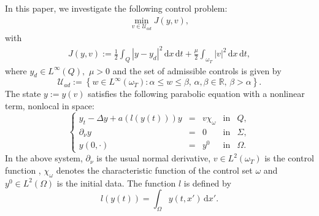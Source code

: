 \documentclass[reqno,twoside]{amsart}
\numberwithin{equation}{section}
\theoremstyle{definition}
\newcommand\abs[1]{\left\lvert#1\right\rvert}
\numberwithin{equation}{section}
\def \dis {\displaystyle}
\def \R {\mathbb{R}}
\def \dxp{\mathrm{d}x'}
\def \dq {\mathrm{d}x \, \mathrm{d}t}
\def \R {\mathbb{R}}
\begin{document}
In this paper, we investigate the following control problem:
\begin{align}\label{opt}
	\dis \min_{v\in {\mathcal{U}_{ad}}}J(y,v),
\end{align}
with
\begin{align}\label{opt1}
	\dis J(y,v):=\frac 12\int_Q \abs{y-y_d}^2\,\dq+\frac{\mu}{2}\int_{\omega_T} \abs{v}^2\,\dq,
\end{align}
where   $y_d\in L^\infty(Q),$  $\mu>0$ and the set of admissible controls is given by	
\begin{equation}\label{defuad}
	\mathcal{U}_{ad}:=\left\{w\in L^\infty(\omega_T): \alpha\leq w\leq \beta,\, \alpha,\beta\in \R,\, \beta>\alpha\right\}.
\end{equation}
The state $y:=y(v)$ satisfies the following parabolic equation with a nonlinear term, nonlocal in space:
\begin{equation}\label{model}
	\left\{
	\begin{array}{rllll}
		\dis y_{t}-\Delta y+a\left(l(y(t))\right)y &=&v\chi_{\omega}& \mbox{in}& Q,\\
		\dis  \partial_\nu y&=&0& \mbox{in}& \Sigma, \\
		\dis  y(0,\cdot)&=&y^0 &\mbox{in}&\Omega.
	\end{array}
	\right.
\end{equation}
In the above system, $\partial_{\nu}$ is the usual normal derivative, $v\in L^2(\omega_T)$ is the control function , $\chi_{\omega}$  denotes the characteristic function of the control set $\omega$ and $y^0\in L^2(\Omega)$ is the initial data. The function $l$ is defined by
\begin{equation}\label{defl}
	l(y(t))=\int_{\Omega}y(t,x')\,\dxp.
\end{equation}
\end{document}
